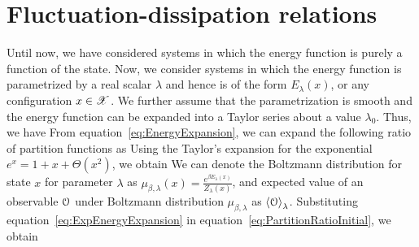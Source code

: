 \documentclass[letterpaper,english,10pt]{article}
\begin{document}
\section{Fluctuation-dissipation relations}
Until now, we have considered systems in which the energy function is purely a function of the state. 
Now, we consider systems in which the energy function is parametrized by a real scalar $\lambda$ and hence is of the form $E_\lambda(x)$, or any configuration $x \in \mathscr{X}$.
We further assume that the parametrization is smooth and the energy function can be expanded into a Taylor series about a value $\lambda_0$. 
Thus, we have
From equation~\eqref{eq:EnergyExpansion}, we can expand the following ratio of partition functions as 
Using the Taylor's expansion for the exponential $e^x = 1 + x + \Theta(x^2)$, we obtain
We can denote the Boltzmann distribution for state $x$ for parameter $\lambda$ as $\mu_{\beta,\lambda}(x) = \frac{e^{\beta E_\lambda(x)}}{Z_\lambda(x)}$, 
and expected value of an observable $\mathcal{O}$ under Boltzmann distribution $\mu_{\beta, \lambda}$ as $\left\langle\mathcal{O}\right\rangle_{\lambda}$. 
Substituting equation~\eqref{eq:ExpEnergyExpansion} in equation~\eqref{eq:PartitionRatioInitial}, 
we obtain
\end{document}
